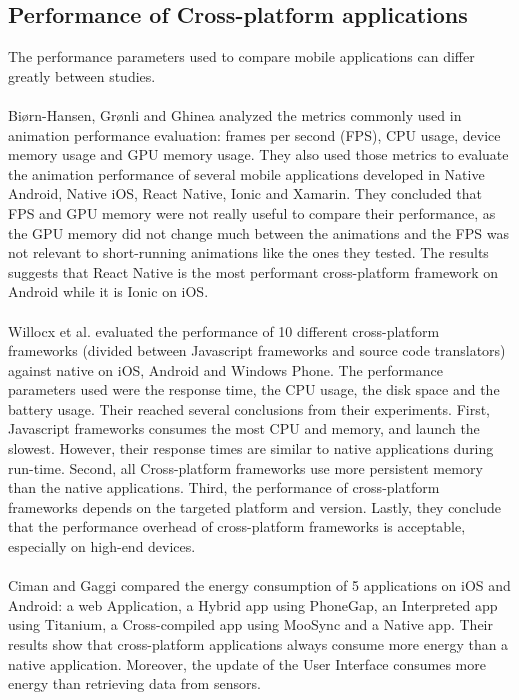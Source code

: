 \documentclass{kththesis}
\begin{document}
\subsection{Performance of Cross-platform applications}

The performance parameters used to compare mobile applications can differ greatly between studies. 

\paragraph{}
Biørn-Hansen, Grønli and Ghinea \cite{animation_performance} analyzed the metrics commonly used in animation performance evaluation: frames per second (FPS), CPU usage, device memory usage and GPU memory usage. They also used those metrics to evaluate the animation performance of several mobile applications developed in Native Android, Native iOS, React Native, Ionic and Xamarin. They concluded that FPS and GPU memory were not really useful to compare their performance, as the GPU memory did not change much between the animations and the FPS was not relevant to short-running animations like the ones they tested. The results suggests that React Native is the most performant cross-platform framework on Android while it is Ionic on iOS.
\paragraph{}
Willocx et al. \cite{willocx2016comparing} evaluated the performance of 10 different cross-platform frameworks (divided between Javascript frameworks and source code translators) against native on iOS, Android and Windows Phone. The performance parameters used were the response time, the CPU usage, the disk space and the battery usage. Their reached several conclusions from their experiments. First, Javascript frameworks consumes the most CPU and memory, and launch the slowest. However, their response times are similar to native applications during run-time. Second, all Cross-platform frameworks use more persistent memory than the native applications. Third, the performance of cross-platform frameworks depends on the targeted platform and version. Lastly, they conclude that the performance overhead of cross-platform frameworks is acceptable, especially on high-end devices. 

\paragraph{}
Ciman and Gaggi \cite{ciman2017empirical} compared the energy consumption of 5 applications on iOS and Android: a web Application, a Hybrid app using PhoneGap, an Interpreted app using Titanium, a Cross-compiled app using MooSync and a Native app. Their results show that cross-platform applications always consume more energy than a native application. Moreover, the update of the User Interface consumes more energy than retrieving data from sensors. 
\end{document}
